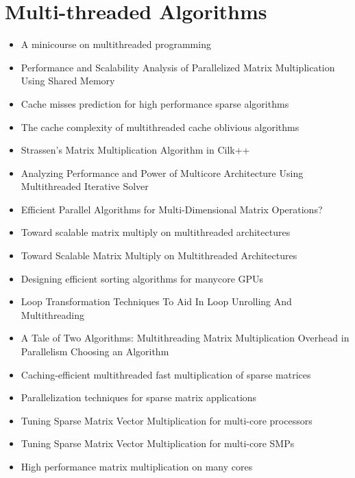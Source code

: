 \section{Multi-threaded Algorithms}
\label{sec:lr-multi-threaded-algorithms}

\begin{itemize}
\item A minicourse on multithreaded programming \cite{Leiserson1998}
\item Performance and Scalability Analysis of Parallelized Matrix
  Multiplication Using Shared Memory \cite{Dinkins2007}
\item Cache misses prediction for high performance sparse algorithms
  \cite{Fraguela1998}
\item The cache complexity of multithreaded cache oblivious algorithms
  \cite{Frigo2009}
\item Strassen's Matrix Multiplication Algorithm in Cilk++
  \cite{Kuszmaul2009}
\item Analyzing Performance and Power of Multicore Architecture Using
  Multithreaded Iterative Solver \cite{Lee2010}
\item Efficient Parallel Algorithms for Multi-Dimensional Matrix
  Operations? \cite{Liu2000}
\item Toward scalable matrix multiply on multithreaded architectures
  \cite{Marker2007}
\item Toward Scalable Matrix Multiply on Multithreaded Architectures
  \cite{Marker2007a}
\item Designing efficient sorting algorithms for manycore GPUs
  \cite{Satish2009}
\item Loop Transformation Techniques To Aid In Loop Unrolling And
  Multithreading \cite{Song2003}
\item A Tale of Two Algorithms: Multithreading Matrix Multiplication
  Overhead in Parallelism Choosing an Algorithm \cite{Steele2010}
\item Caching-efficient multithreaded fast multiplication of sparse
  matrices \cite{Sulatycke1998}
\item Parallelization techniques for sparse matrix applications
  \cite{Ujaldon1996}
\item Tuning Sparse Matrix Vector Multiplication for multi-core
  processors \cite{Williams2007}
\item Tuning Sparse Matrix Vector Multiplication for multi-core SMPs
  \cite{Williams2007a}
\item High performance matrix multiplication on many cores

\end{itemize}
